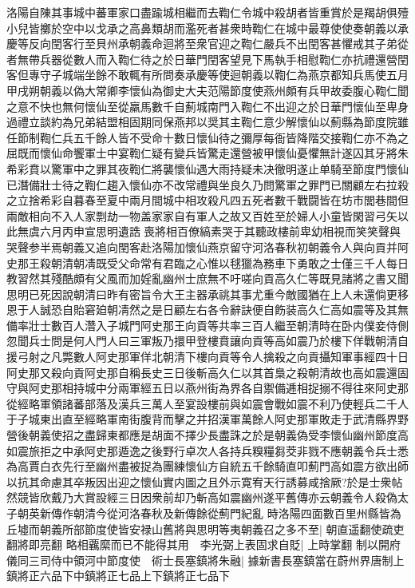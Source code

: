 {洛陽自陳其事城中蕃軍家口盡踰城相繼而去鞫仁令城中殺胡者皆重賞於是羯胡俱殪小兒皆擲於空中以戈承之高鼻類胡而濫死者甚衆時鞫仁在城中最尊使使奏朝義以承慶等反向閏客行至貝州承朝義命迴將至衆官迎之鞫仁嚴兵不出閏客甚懼戒其子弟從者無帶兵器從數人而入鞫仁待之於日華門閏客望見下馬執手相慰鞫仁亦抗禮還營閏客但專守子城端坐餘不敢輒有所問奏承慶等使迴朝義以鞫仁為燕京都知兵馬使五月甲戌朔朝義以偽大常卿李懷仙為御史大夫范陽節度使燕州頗有兵甲故委腹心鞫仁聞之意不快也無何懷仙至從羸馬數千自薊城南門入鞫仁不出迎之於日華門懷仙至卑身過禮立談約為兄弟結盟相固期同保燕邦以奨其主鞫仁意少解懷仙以薊縣為節度院雖任節制鞫仁兵五千餘人皆不受命十數日懷仙待之彌厚每衙皆降階交接鞫仁亦不為之屈既而懷仙命饗軍士中宴鞫仁疑有變兵皆驚走還營被甲懷仙憂懼無計遂囚其牙將朱希彩賁以驚軍中之罪其夜鞫仁將襲懷仙遇大雨持疑未决徹明遂止单騎至節度門懷仙已潛備壯士待之鞫仁趨入懷仙亦不改常禮與坐良久乃問驚軍之罪門已關顧左右拉殺之立捨希彩自暮春至夏中兩月間城中相攻殺凡四五死者數千戰闘皆在坊市閭巷間但兩敵相向不入人家剽劫一物盖家家自有軍人之故又百姓至於婦人小童皆閑習弓矢以此無虞六月丙申宣思明遺誥喪將相百僚縞素哭于其聽政樓前卑幼相視而笑笑聲與哭聲参半焉朝義又追向閏客赴洛陽加懷仙燕京留守河洛春秋初朝義令人與向貢并阿史那王殺朝清朝凊既受父命常有君臨之心惟以毬獵為務車下勇敢之士僅三千人每日教習然其殘酷頗有父風而加婬亂幽州士庶無不吁嗟向貢高久仁等既見諸將之書又聞思明已死因說朝清曰昨有密旨令大王主器承祧其事尤重今敵國猶在上人未還倘更移恩于人誠恐自貽窘廹朝凊然之是日顧左右各令辭訣便自飭装高久仁高如震等及其無備率壯士數百人濳入子城門阿史那王向貢等共率三百人繼至朝清時在卧内僕妾侍側忽聞兵士問是何人門人曰三軍叛乃擐甲登樓賁讓向貢等高如震乃於樓下佯戰朝清自援弓射之凡斃數人阿史那軍佯北朝清下樓向貢等令人擒殺之向貢攝知軍事經四十日阿史那又殺向貢阿史那自稱長史三日後斬高久仁以其首梟之殺朝清故也高如震還固守與阿史那相持城中分兩軍經五日以燕州街為界各自禦備逓相捉搦不得往來阿史那從經略軍領諸蕃部落及漢兵三萬人至宴設樓前與如震會戰如震不利乃使輕兵二千人于子城東出直至經略軍南街腹背而擊之并招漢軍萬餘人阿史那軍敗走于武清縣界野營後朝義使招之盡歸東都應是胡面不擇少長盡誅之於是朝義偽受李懷仙幽州節度高如震旅拒之中承阿史那遁逸之後野行卓次人各持兵糗糧芻茭非戮不應朝義令兵士悉為高賈白衣先行至幽州盡被捉為團練懷仙方自統五千餘騎直叩薊門高如震方欲出師以抗其命慮其卒叛因出迎之懷仙實内圖之且外示寛宥天行誘募咸捨厥?於是士衆帖然競皆欣戴乃大賞設經三日因衆前却乃斬高如震幽州遂平舊傳亦云朝義令人殺偽太子朝英新傳作朝清今從河洛春秋及新傳餘從薊門紀亂}
時洛陽四面數百里州縣皆為丘墟而朝義所部節度使皆安禄山舊將與思明等夷朝義召之多不至|{
	朝直遥翻使疏吏翻將即亮翻}
略相覊縻而已不能得其用　李光弼上表固求自貶|{
	上時掌翻}
制以開府儀同三司侍中領河中節度使　術士長塞鎮將朱融|{
	據新書長塞鎮當在蔚州界唐制上鎮將正六品下中鎮將正七品上下鎮將正七品下}
